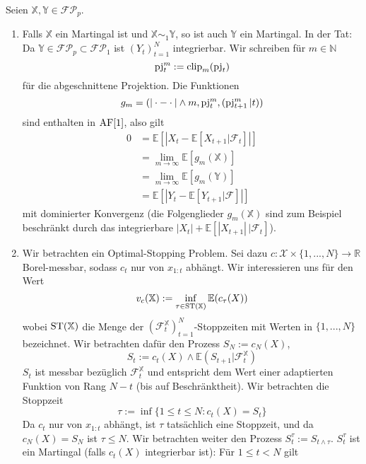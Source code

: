 \begin{example}\label{thm:adapted_examples}
    Seien $\mathbb{X,Y} \in\mathcal{FP}_p$.
    \begin{enumerate}
        \item Falls $\mathbb{X}$ ein Martingal ist und $\mathbb{X}\sim_1 \mathbb{Y}$, so ist auch $\mathbb{Y}$ ein Martingal. In der Tat: Da $\mathbb{Y} \in \mathcal{FP}_p \subset \mathcal{FP}_1$ ist $(Y_t)_{t=1}^N$ integrierbar. Wir schreiben für $m \in \mathbb{N}$ 
        $$\operatorname{pj}_t^m:=\operatorname{clip}_m(\operatorname{pj}_t)$$
         für die abgeschnittene Projektion. Die Funktionen 
         $$g_m = (|\cdot - \cdot |\wedge m, \operatorname{pj}^m_t, (\operatorname{pj}^m_{t+1}\vert t))$$
         sind enthalten in $\operatorname{AF}[1]$, also gilt
         \begin{align*}
            0 &= \mathbb{E}\left[ |X_t - \mathbb{E}[X_{t+1} \vert \mathcal{F}_t]| \right] \\
            &= \lim_{m\rightarrow \infty} \mathbb{E}[g_m(\mathbb{X})] \\
            &= \lim_{m\rightarrow\infty} \mathbb{E}[g_m(\mathbb{Y})] \\
            &= \mathbb{E}\left[|Y_t - \mathbb{E}[Y_{t+1} \vert \mathcal{F}] |\right]
         \end{align*}
         mit dominierter Konvergenz (die Folgenglieder $g_m(\mathbb{X})$ sind zum Beispiel beschränkt durch das integrierbare $|X_t| + \mathbb{E}[|X_{t+1}| \,\vert \mathcal{F}_t]$).
         \item Wir betrachten ein Optimal-Stopping Problem. Sei dazu $c:\mathcal{X} \times \{1,...,N\}\rightarrow \mathbb{R}$ Borel-messbar, sodass $c_t$ nur von $x_{1:t}$ abhängt. Wir interessieren uns für den Wert 
         $$v_c(\mathbb{X}) := \inf\limits_{\tau \in \operatorname{ST}(\mathbb{X})}\mathbb{E}(c_\tau(X))$$
         wobei $\operatorname{ST}(\mathbb{X})$ die Menge der $\left(\mathcal{F}_t^\mathbb{X}\right)_{t=1}^N$-Stoppzeiten mit Werten in $\{1,...,N\}$ bezeichnet. Wir betrachten dafür den Prozess $S_N:=c_N(X)$, 
         \begin{equation} \label{eq:45_20}
            S_t := c_t(X) \wedge \mathbb{E}(S_{t+1} \vert \mathcal{F}_t^\mathbb{X})
         \end{equation}
         $S_t$ ist messbar bezüglich $\mathcal{F}_t^\mathbb{X}$ und entspricht dem Wert einer adaptierten Funktion von Rang $N-t$ (bis auf Beschränktheit).
         Wir betrachten die Stoppzeit 
         $$\tau := \inf\{ 1\leq t\leq N: c_t(X) = S_t\}$$ 
         Da $c_t$ nur von $x_{1:t}$ abhängt, ist $\tau$ tatsächlich eine Stoppzeit, und da $c_N(X)=S_N$ ist $\tau \leq N$. Wir betrachten weiter den Prozess $S^\tau_t:=S_{t\wedge \tau}$. $S^\tau_t$ ist ein Martingal (falls $c_t(X)$ integrierbar ist): Für $1\leq t< N$ gilt 

\end{enumerate}
\end{example}
